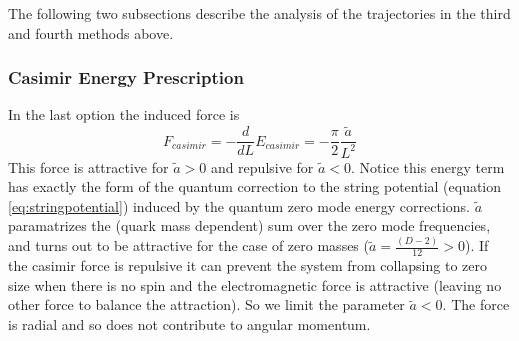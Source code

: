\documentclass[11pt,a4paper]{article}
\begin{document}
The following two subsections describe the analysis of the trajectories in the third and fourth methods above.





\FloatBarrier
\subsubsection{Casimir Energy Prescription}
In the last option the induced force is 
\begin{equation}
F_{casimir}=-\frac{d}{dL}E_{casimir}=-\frac{\pi}{2}\frac{\tilde{a}}{L^{2}}
\end{equation}
This force is attractive for $\tilde{a}>0$ and repulsive for $\tilde{a}<0$. Notice this energy term has exactly the form of the quantum correction to the string potential (equation \ref{eq:stringpotential}) induced by the quantum zero mode energy corrections. $\tilde{a}$ paramatrizes the (quark mass dependent) sum over the zero mode frequencies, and turns out to be attractive for the case of zero masses ($\tilde{a}=\frac{\left(D-2\right)}{12}>0$). If the casimir force is repulsive it can prevent the system from collapsing to zero size when there is no spin and the electromagnetic force is attractive (leaving no other force to balance the attraction). So we limit the parameter $\tilde{a}<0$. The force is radial and so does not contribute to angular momentum.
\end{document}
